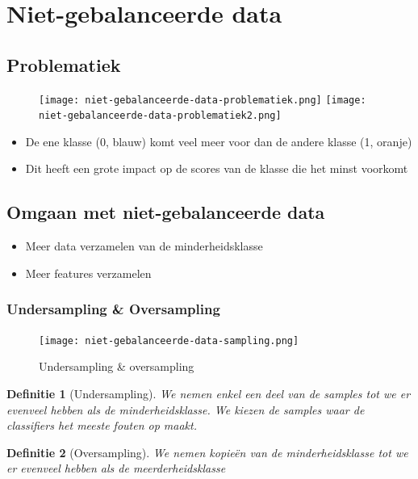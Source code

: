 \documentclass{article}
\newtheorem{theorem}{Definitie}[section]
\begin{document}
\section{Niet-gebalanceerde data}

\subsection{Problematiek}

\begin{figure}[H]
    \centering
    \texttt{[image: niet-gebalanceerde-data-problematiek.png]}
    \texttt{[image: niet-gebalanceerde-data-problematiek2.png]}
\end{figure}

\begin{itemize}
    \item De ene klasse (0, blauw) komt veel meer voor dan de andere klasse (1, oranje)
    \item Dit heeft een grote impact op de scores van de klasse die het minst voorkomt
\end{itemize}

\subsection{Omgaan met niet-gebalanceerde data}

\begin{itemize}
    \item Meer data verzamelen van de minderheidsklasse
    \item Meer features verzamelen
\end{itemize}

\subsubsection{Undersampling \& Oversampling}

\begin{figure}[H]
    \centering
    \texttt{[image: niet-gebalanceerde-data-sampling.png]}
    \caption{Undersampling \& oversampling}
\end{figure}

\begin{theorem}[Undersampling]
    We nemen enkel een deel van de samples tot we er evenveel hebben als de minderheidsklasse.
    We kiezen de samples waar de classifiers het meeste fouten op maakt.
\end{theorem}

\begin{theorem}[Oversampling]
    We nemen kopieën van de minderheidsklasse tot we er evenveel hebben als de meerderheidsklasse
\end{theorem}
\end{document}
